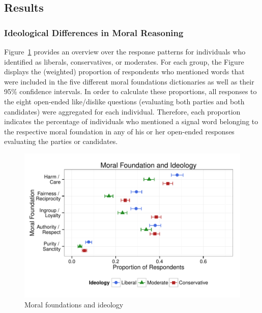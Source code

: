 \documentclass[12pt]{article}
\begin{document}
\subsection{Results}

\subsubsection{Ideological Differences in Moral Reasoning}

Figure~\ref{fig:1prop} provides an overview over the response patterns for individuals who identified as liberals, conservatives, or moderates. For each group, the Figure displays the (weighted) proportion of respondents who mentioned words that were included in the five different moral foundations dictionaries as well as their 95\% confidence intervals. In order to calculate these proportions, all responses to the eight open-ended like/dislike questions (evaluating both parties and both candidates) were aggregated for each individual. Therefore, each proportion indicates the percentage of individuals who mentioned a signal word belonging to the respective moral foundation in any of his or her open-ended responses evaluating the parties or candidates.

\begin{figure}[ht]\centering
\includegraphics{../calc/fig/fig1prop.pdf}
\caption{Moral foundations and ideology}\label{fig:1prop}
\end{figure}
\end{document}
